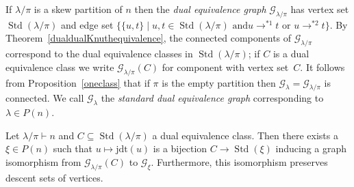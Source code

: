 \documentclass[ALCO,ThmDefs,Unicode,epreuves]{cedram}
\newcommand{\jdt}{\mathrm{jdt}}
\DeclareMathOperator{\STD}{Std}
\begin{document}
If $\lambda/\pi$ is a skew partition of $n$ then the
\emph{dual equivalence graph} $\mathcal{G}_{\lambda/\pi}$
has vertex set $\STD(\lambda/\pi)$ and edge set
$\big\{\{u,t\}\mid u,t\in\STD(\lambda/\pi)\text{ and
$u\to^{*1}t$ or $u\to^{*2}t$}\big\}$. By Theorem~\ref{dualdualKnuthequivalence},
the connected components of $\mathcal{G}_{\lambda/\pi}$ correspond to the dual
equivalence classes in $\STD(\lambda/\pi)$; if $C$ is a dual equivalence class
we write $\mathcal{G}_{\lambda/\pi}(C)$ for component with vertex set~$C$.
It follows from Proposition~\ref{oneclass} that if $\pi$ is the empty partition
then $\mathcal{G}_{\lambda}=\mathcal{G}_{\lambda/\pi}$ is connected.
We call $\mathcal{G}_{\lambda}$ the \emph{standard dual equivalence graph}
corresponding to $\lambda\in P(n)$.
\begin{prop}\label{glambdapiconnectedcomps}
Let $\lambda/\pi\vdash n$ and $C\subseteq\STD(\lambda/\pi)$ a dual equivalence class.
Then there exists a $\xi\in P(n)$ such that $u\mapsto\jdt(u)$ is a bijection
$C\to\STD(\xi)$ inducing a graph isomorphism from
$\mathcal{G}_{\lambda/\pi}(C)$ to $\mathcal{G}_{\xi}$.
Furthermore, this isomorphism preserves descent sets of vertices.
\end{prop}
\end{document}
